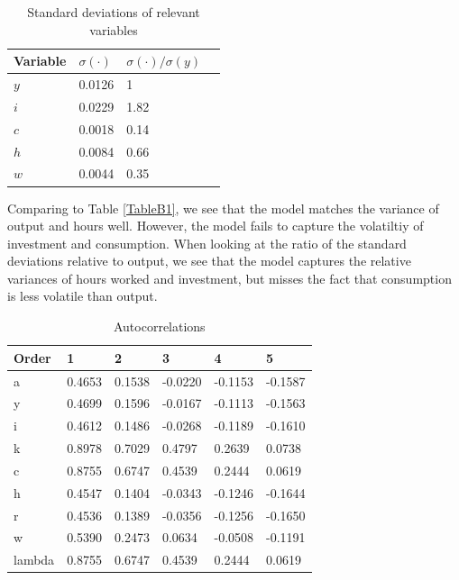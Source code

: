 \documentclass[10pt,letter]{article}
\begin{document}
\begin{table}[H]
	\centering
	\begin{tabular}{l|lll}
		Variable & $\sigma(\cdot)$ & $\sigma(\cdot)/\sigma(y)$ \\\hline
				$y$ & 0.0126 & 1    &  \\
				$i$ & 0.0229 & 1.82 &  \\
				$c$ & 0.0018 & 0.14 &  \\
				$h$ & 0.0084 & 0.66 &  \\
				$w$ & 0.0044 & 0.35 &  
	\end{tabular}
\caption{Standard deviations of relevant variables}
\end{table}
Comparing to Table \ref{TableB1}, we see that the model matches the variance of output and  hours well. However, the model fails to capture the volatiltiy of investment and consumption. When looking at the ratio of the standard deviations relative to output, we see that the model captures the relative variances of hours worked and investment, but misses the fact that consumption is less volatile than output.

\begin{table}[H]
	\centering
	\begin{tabular}{l|lllll}
		Order  & 1      & 2      & 3       & 4       & 5       \\\hline
		a      & 0.4653 & 0.1538 & -0.0220 & -0.1153 & -0.1587 \\
		y      & 0.4699 & 0.1596 & -0.0167 & -0.1113 & -0.1563 \\
		i      & 0.4612 & 0.1486 & -0.0268 & -0.1189 & -0.1610 \\
		k      & 0.8978 & 0.7029 & 0.4797  & 0.2639  & 0.0738  \\
		c      & 0.8755 & 0.6747 & 0.4539  & 0.2444  & 0.0619  \\
		h      & 0.4547 & 0.1404 & -0.0343 & -0.1246 & -0.1644 \\
		r      & 0.4536 & 0.1389 & -0.0356 & -0.1256 & -0.1650 \\
		w      & 0.5390 & 0.2473 & 0.0634  & -0.0508 & -0.1191 \\
		lambda & 0.8755 & 0.6747 & 0.4539  & 0.2444  & 0.0619 
	\end{tabular}
\caption{Autocorrelations}
\end{table}
\end{document}
